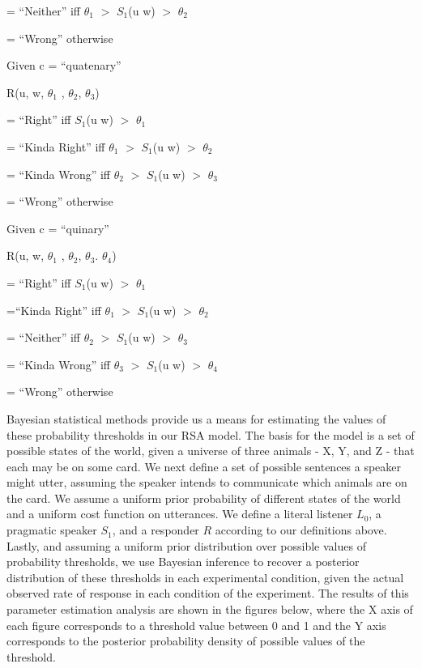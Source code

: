 \documentclass[floatsintext,man]{apa6}
\theoremstyle{definition}
\theoremstyle{definition}
\theoremstyle{definition}
\theoremstyle{remark}
\begin{document}
= \enquote{Neither} iff \(\theta_1\) \(>\) \(S_1\)(u \textbar{} w) \(>\)
\(\theta_2\)

= \enquote{Wrong} otherwise

Given c = \enquote{quatenary}

R(u, w, \(\theta_1\) , \(\theta_2\), \(\theta_3\))

= \enquote{Right} iff \(S_1\)(u \textbar{} w) \(>\) \(\theta_1\)

= \enquote{Kinda Right} iff \(\theta_1\) \(>\) \(S_1\)(u \textbar{} w)
\(>\) \(\theta_2\)

= \enquote{Kinda Wrong} iff \(\theta_2\) \(>\) \(S_1\)(u \textbar{} w)
\(>\) \(\theta_3\)

= \enquote{Wrong} otherwise

Given c = \enquote{quinary}

R(u, w, \(\theta_1\) , \(\theta_2\), \(\theta_3\). \(\theta_4\))

= \enquote{Right} iff \(S_1\)(u \textbar{} w) \(>\) \(\theta_1\)

=\enquote{Kinda Right} iff \(\theta_1\) \(>\) \(S_1\)(u \textbar{} w)
\(>\) \(\theta_2\)

= \enquote{Neither} iff \(\theta_2\) \(>\) \(S_1\)(u \textbar{} w) \(>\)
\(\theta_3\)

= \enquote{Kinda Wrong} iff \(\theta_3\) \(>\) \(S_1\)(u \textbar{} w)
\(>\) \(\theta_4\)

= \enquote{Wrong} otherwise

Bayesian statistical methods provide us a means for estimating the
values of these probability thresholds in our RSA model. The basis for
the model is a set of possible states of the world, given a universe of
three animals - X, Y, and Z - that each may be on some card. We next
define a set of possible sentences a speaker might utter, assuming the
speaker intends to communicate which animals are on the card. We assume
a uniform prior probability of different states of the world and a
uniform cost function on utterances. We define a literal listener
\(L_0\), a pragmatic speaker \(S_1\), and a responder \(R\) according to
our definitions above. Lastly, and assuming a uniform prior distribution
over possible values of probability thresholds, we use Bayesian
inference to recover a posterior distribution of these thresholds in
each experimental condition, given the actual observed rate of response
in each condition of the experiment. The results of this parameter
estimation analysis are shown in the figures below, where the X axis of
each figure corresponds to a threshold value between 0 and 1 and the Y
axis corresponds to the posterior probability density of possible values
of the threshold.
\end{document}
